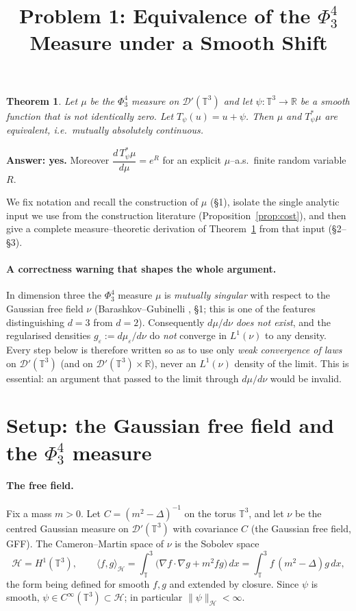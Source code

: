 \documentclass[12pt]{article}
\title{Problem 1: Equivalence of the $\Phi^4_3$ Measure under a Smooth Shift}
\date{}
\newtheorem{theorem}{Theorem}
\theoremstyle{definition}
\newcommand{\T}{\mathbb{T}^3}
\newcommand{\R}{\mathbb{R}}
\newcommand{\D}{\mathcal{D}'(\T)}
\begin{document}
\maketitle

\begin{theorem}\label{thm:main}
Let $\mu$ be the $\Phi^4_3$ measure on $\D$ and let $\psi\colon\T\to\R$ be a smooth
function that is not identically zero. Let $T_\psi(u)=u+\psi$. Then $\mu$ and
$T_\psi^{*}\mu$ are equivalent, i.e.\ mutually absolutely continuous.
\end{theorem}

\noindent\textbf{Answer: yes.} Moreover $\dfrac{d\,T_\psi^{*}\mu}{d\mu}=e^{R}$ for an
explicit $\mu$--a.s.\ finite random variable $R$.

We fix notation and recall the construction of $\mu$ (\S1), isolate the single analytic
input we use from the construction literature (Proposition~\ref{prop:cost}), and then
give a complete measure--theoretic derivation of Theorem~\ref{thm:main} from that input
(\S2--\S3).

\paragraph{A correctness warning that shapes the whole argument.}
In dimension three the $\Phi^4_3$ measure $\mu$ is \emph{mutually singular} with respect to
the Gaussian free field $\nu$ (Barashkov--Gubinelli \cite{BG}, \S1; this is one of the
features distinguishing $d=3$ from $d=2$). Consequently $d\mu/d\nu$ \emph{does not exist},
and the regularised densities $g_\varepsilon:=d\mu_\varepsilon/d\nu$ do \emph{not} converge
in $L^1(\nu)$ to any density. Every step below is therefore written so as to use only
\emph{weak convergence of laws} on $\D$ (and on $\D\times\R$), never an
$L^1(\nu)$ density of the limit. This is essential: an argument that passed to the limit
through $d\mu/d\nu$ would be invalid.

\section{Setup: the Gaussian free field and the $\Phi^4_3$ measure}

\paragraph{The free field.}
Fix a mass $m>0$. Let $C=(m^2-\Delta)^{-1}$ on the torus $\T$, and let $\nu$ be the
centred Gaussian measure on $\D$ with covariance $C$ (the Gaussian free field, GFF). The
Cameron--Martin space of $\nu$ is the Sobolev space
\begin{equation}\label{eq:CM-space}
  \mathcal{H}=H^1(\T),\qquad
  \langle f,g\rangle_{\mathcal H}=\int_\T\big(\nabla f\cdot\nabla g+m^2 fg\big)\,dx
  =\int_\T f\,(m^2-\Delta)g\,dx ,
\end{equation}
the form being defined for smooth $f,g$ and extended by closure. Since $\psi$ is smooth,
$\psi\in C^\infty(\T)\subset\mathcal H$; in particular $\|\psi\|_{\mathcal H}<\infty$.
\end{document}
